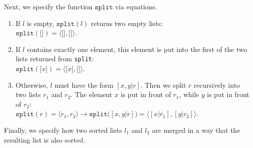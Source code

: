 \noindent
Next, we specify the function $\texttt{split}$ via equations.
\begin{enumerate}
\item If $l$ is empty, $\mathtt{split}(l)$ returns two empty lists:\\[0.2cm]
      \hspace*{1.3cm} 
      $\mathtt{split}(\texttt{[]}) = \langle \texttt{[]}, \texttt{[]} \rangle$.
\item If $l$ contains exactly one element, this element is put into the first of the two lists
      returned from \texttt{split}: \\[0.2cm]
      \hspace*{1.3cm} 
      $\mathtt{split}(\mathtt{[}x\mathtt{]}) = \langle \texttt{[}x\texttt{]}, \texttt{[]} \rangle$.
\item Otherwise, $l$ must have the form $[x, y | r]$.
      Then we split $r$ recursively into two lists $r_1$ and $r_2$.  The element $x$ is put in front
      of $r_1$, while $y$ is put in front of $r_2$:
      \\[0.2cm]
      \hspace*{1.3cm} 
      $\mathtt{split}(r) = \langle r_1, r_2 \rangle \rightarrow \mathtt{split}\bigl([x, y|r]\bigr) = \bigl\langle [x|r_1], [y|r_2] \bigr\rangle$.
\end{enumerate}
Finally, we specify how two sorted lists $l_1$ and $l_2$ are merged in a way that the resulting list
is also sorted.
